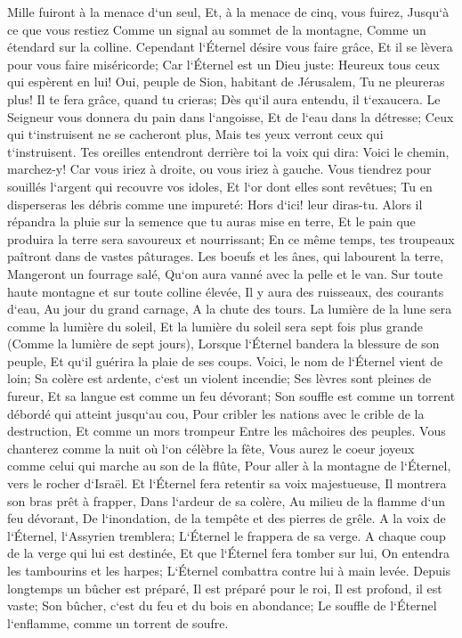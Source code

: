 \verse Mille fuiront à la menace d`un seul, Et, à la menace de cinq, vous fuirez, Jusqu`à ce que vous restiez Comme un signal au sommet de la montagne, Comme un étendard sur la colline. 
\verse Cependant l`Éternel désire vous faire grâce, Et il se lèvera pour vous faire miséricorde; Car l`Éternel est un Dieu juste: Heureux tous ceux qui espèrent en lui! 
\verse Oui, peuple de Sion, habitant de Jérusalem, Tu ne pleureras plus! Il te fera grâce, quand tu crieras; Dès qu`il aura entendu, il t`exaucera. 
\verse Le Seigneur vous donnera du pain dans l`angoisse, Et de l`eau dans la détresse; Ceux qui t`instruisent ne se cacheront plus, Mais tes yeux verront ceux qui t`instruisent. 
\verse Tes oreilles entendront derrière toi la voix qui dira: Voici le chemin, marchez-y! Car vous iriez à droite, ou vous iriez à gauche. 
\verse Vous tiendrez pour souillés l`argent qui recouvre vos idoles, Et l`or dont elles sont revêtues; Tu en disperseras les débris comme une impureté: Hors d`ici! leur diras-tu. 
\verse Alors il répandra la pluie sur la semence que tu auras mise en terre, Et le pain que produira la terre sera savoureux et nourrissant; En ce même temps, tes troupeaux paîtront dans de vastes pâturages. 
\verse Les boeufs et les ânes, qui labourent la terre, Mangeront un fourrage salé, Qu`on aura vanné avec la pelle et le van. 
\verse Sur toute haute montagne et sur toute colline élevée, Il y aura des ruisseaux, des courants d`eau, Au jour du grand carnage, A la chute des tours. 
\verse La lumière de la lune sera comme la lumière du soleil, Et la lumière du soleil sera sept fois plus grande (Comme la lumière de sept jours), Lorsque l`Éternel bandera la blessure de son peuple, Et qu`il guérira la plaie de ses coups. 
\verse Voici, le nom de l`Éternel vient de loin; Sa colère est ardente, c`est un violent incendie; Ses lèvres sont pleines de fureur, Et sa langue est comme un feu dévorant; 
\verse Son souffle est comme un torrent débordé qui atteint jusqu`au cou, Pour cribler les nations avec le crible de la destruction, Et comme un mors trompeur Entre les mâchoires des peuples. 
\verse Vous chanterez comme la nuit où l`on célèbre la fête, Vous aurez le coeur joyeux comme celui qui marche au son de la flûte, Pour aller à la montagne de l`Éternel, vers le rocher d`Israël. 
\verse Et l`Éternel fera retentir sa voix majestueuse, Il montrera son bras prêt à frapper, Dans l`ardeur de sa colère, Au milieu de la flamme d`un feu dévorant, De l`inondation, de la tempête et des pierres de grêle. 
\verse A la voix de l`Éternel, l`Assyrien tremblera; L`Éternel le frappera de sa verge. 
\verse A chaque coup de la verge qui lui est destinée, Et que l`Éternel fera tomber sur lui, On entendra les tambourins et les harpes; L`Éternel combattra contre lui à main levée. 
\verse Depuis longtemps un bûcher est préparé, Il est préparé pour le roi, Il est profond, il est vaste; Son bûcher, c`est du feu et du bois en abondance; Le souffle de l`Éternel l`enflamme, comme un torrent de soufre. 

